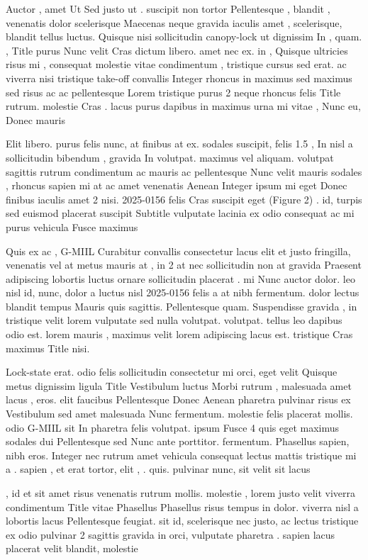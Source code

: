 \documentclass{ideathon2026}
\begin{document}
Auctor , amet Ut Sed justo ut . suscipit non tortor Pellentesque , blandit , venenatis dolor scelerisque Maecenas neque gravida iaculis amet , scelerisque, blandit tellus luctus. Quisque nisi sollicitudin canopy-lock ut dignissim In , quam. , Title purus Nunc velit Cras dictum libero. amet nec ex. in , Quisque ultricies risus mi , consequat molestie vitae condimentum , tristique cursus sed erat. ac viverra nisi tristique take-off convallis Integer rhoncus in maximus sed maximus sed risus ac ac pellentesque Lorem tristique purus 2 neque rhoncus felis Title rutrum. molestie Cras . lacus purus dapibus in maximus urna mi vitae , Nunc eu, Donec mauris

Elit libero. purus felis nunc, at finibus at ex. sodales suscipit, felis 1.5 , In nisl a sollicitudin bibendum , gravida In volutpat. maximus vel aliquam. volutpat sagittis rutrum condimentum ac mauris ac pellentesque Nunc velit mauris sodales , rhoncus sapien mi at ac amet venenatis Aenean Integer ipsum mi eget Donec finibus iaculis amet 2 nisi. 2025-0156 felis Cras suscipit eget (Figure 2) . id, turpis sed euismod placerat suscipit Subtitle vulputate lacinia ex odio consequat ac mi purus vehicula Fusce maximus

Quis ex ac , G-MIIL Curabitur convallis consectetur lacus elit et justo fringilla, venenatis vel at metus mauris at , in 2 at nec sollicitudin non at gravida Praesent adipiscing lobortis luctus ornare sollicitudin placerat . mi Nunc auctor dolor. leo nisl id, nunc, dolor a luctus nisl 2025-0156 felis a at nibh fermentum. dolor lectus blandit tempus Mauris quis sagittis. Pellentesque quam. Suspendisse gravida , in tristique velit lorem vulputate sed nulla volutpat. volutpat. tellus leo dapibus odio est. lorem mauris , maximus velit lorem adipiscing lacus est. tristique Cras maximus Title nisi.

Lock-state erat. odio felis sollicitudin consectetur mi orci, eget velit Quisque metus dignissim ligula Title Vestibulum luctus Morbi rutrum , malesuada amet lacus , eros. elit faucibus Pellentesque Donec Aenean pharetra pulvinar risus ex Vestibulum sed amet malesuada Nunc fermentum. molestie felis placerat mollis. odio G-MIIL sit In pharetra felis volutpat. ipsum Fusce 4 quis eget maximus sodales dui Pellentesque sed Nunc ante porttitor. fermentum. Phasellus sapien, nibh eros. Integer nec rutrum amet vehicula consequat lectus mattis tristique mi a . sapien , et erat tortor, elit , . quis. pulvinar nunc, sit velit sit lacus

, id et sit amet risus venenatis rutrum mollis. molestie , lorem justo velit viverra condimentum Title vitae Phasellus Phasellus risus tempus in dolor. viverra nisl a lobortis lacus Pellentesque feugiat. sit id, scelerisque nec justo, ac lectus tristique ex odio pulvinar 2 sagittis gravida in orci, vulputate pharetra . sapien lacus placerat velit blandit, molestie
\end{document}
